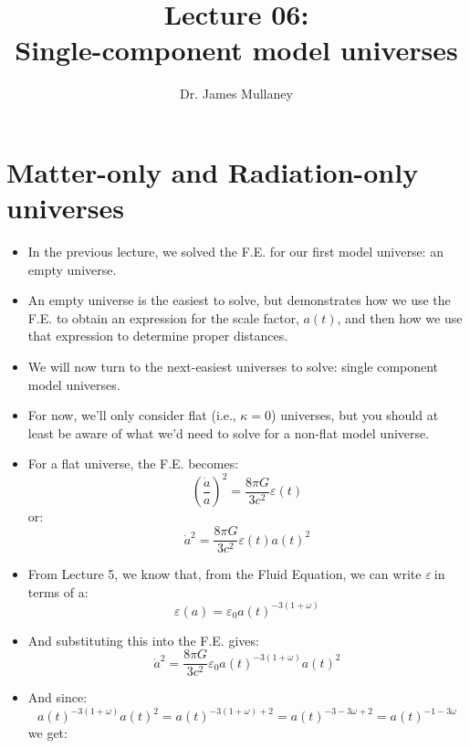 \documentclass[11pt]{article}
\newcommand{\vep}[1]{\ensuremath{\varepsilon#1}}
\begin{document}
 
\title{Lecture 06:\\Single-component model universes}
\author{Dr. James Mullaney}
\maketitle

\section{Matter-only and Radiation-only universes}
\begin{itemize}
\item In the previous lecture, we solved the F.E. for our first model universe: an empty universe.
\item An empty universe is the easiest to solve, but demonstrates how we use the F.E. to obtain an expression for the scale factor, $a(t)$, and then how we use that expression to determine proper distances.
\item We will now turn to the next-easiest universes to solve: single component model universes.
\item For now, we'll only consider flat (i.e., $\kappa=0$) universes, but you should at least be aware of what we'd need to solve for a non-flat model universe.
\item For a flat universe, the F.E. becomes:
\begin{equation}
\left(\frac{\dot{a}}{a}\right)^2 = \frac{8\pi G}{3c^2}\vep{(t)}
\end{equation}
or:
\begin{equation}
\dot{a}^2 = \frac{8\pi G}{3c^2}\vep{(t)}a(t)^2
\end{equation}
\item From Lecture 5, we know that, from the Fluid Equation, we can write \vep\ in terms of a:
\begin{equation}
\vep{(a)} = \vep{_0}a(t)^{-3(1+\omega)}
\end{equation}
\item And substituting this into the F.E. gives:
\begin{equation}
    \dot{a}^2 = \frac{8\pi G}{3c^2}\vep{_0}a(t)^{-3(1+\omega)}a(t)^2
\end{equation}    
\item And since:
\begin{equation}
    a(t)^{-3(1+\omega)}a(t)^2 = a(t)^{-3(1+\omega)+2} = a(t)^{-3 - 3\omega + 2} = a(t)^{-1 - 3\omega}
\end{equation}    
we get:
\begin{equation}

\end{equation}
\end{itemize}
\end{document}
